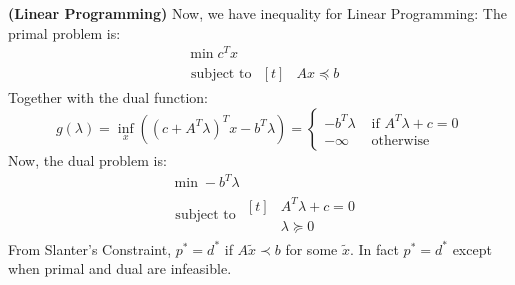 \begin{remark}{\textbf{(Linear Programming)}}
    Now, we have inequality for Linear Programming: The primal problem is:
    \begin{equation*}
    \begin{aligned}
        &\min c^Tx \\
        &\text{ subject to } \begin{aligned}[t]
            &Ax\preceq b
        \end{aligned}
    \end{aligned}
    \end{equation*} 
    Together with the dual function: 
    \begin{equation*}
        g(\lambda) = \inf_x((c+ A^T\lambda)^Tx-b^T\lambda) = \begin{cases}
            -b^T\lambda &\text{ if } A^T\lambda + c = 0 \\
            -\infty &\text{ otherwise }
        \end{cases}
    \end{equation*}
    Now, the dual problem is:
    \begin{equation*}
    \begin{aligned}
        &\min -b^T\lambda \\
        &\text{ subject to } \begin{aligned}[t]
            &A^T\lambda + c = 0 \\
            &\lambda\succeq0
        \end{aligned}
    \end{aligned}
    \end{equation*} 
    From Slanter's Constraint, $p^*=d^*$ if $A\tilde{x}\prec b$ for some $\tilde{x}$. In fact $p^*=d^*$ except when primal and dual are infeasible. 
\end{remark}

